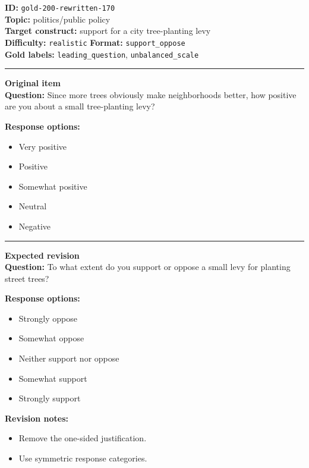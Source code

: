 \documentclass[10pt,a4paper]{article}
\newcommand{\sectionline}{\vspace{0.15em}\hrule\vspace{0.35em}}
\begin{document}
\begin{tcolorbox}[colframe=FlawRed,colback=white,colbacktitle=FlawRed!9,coltitle=black,title={Item 170\hfill Flawed item}]
\textbf{ID:} \texttt{gold-200-rewritten-170}\\
\textbf{Topic:} politics/public policy\\
\textbf{Target construct:} support for a city tree-planting levy\\
\textbf{Difficulty:} \texttt{realistic} \quad \textbf{Format:} \texttt{support\_oppose}\\
\textbf{Gold labels:} \texttt{leading\_question}, \texttt{unbalanced\_scale}\\
\sectionline
\textbf{Original item}\\
\textbf{Question:} Since more trees obviously make neighborhoods better, how positive are you about a small tree-planting levy?
\par\textbf{Response options:}
\begin{itemize}
\item Very positive
\item Positive
\item Somewhat positive
\item Neutral
\item Negative
\end{itemize}
\sectionline
\textbf{Expected revision}\\
\textbf{Question:} To what extent do you support or oppose a small levy for planting street trees?
\par\textbf{Response options:}
\begin{itemize}
\item Strongly oppose
\item Somewhat oppose
\item Neither support nor oppose
\item Somewhat support
\item Strongly support
\end{itemize}
\par\textbf{Revision notes:}
\begin{itemize}
\item Remove the one-sided justification.
\item Use symmetric response categories.
\end{itemize}
\end{tcolorbox}
\end{document}
